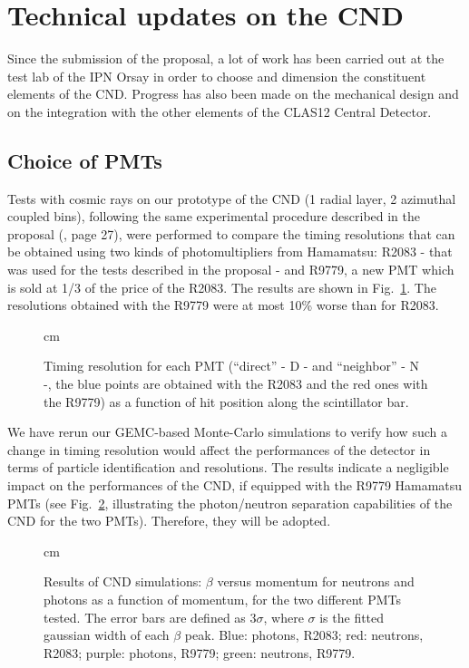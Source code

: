 \documentclass[12pt,oneside]{article}
\begin{document}
{\section{Technical updates on the CND}
Since the submission of the proposal, a lot of work has been carried out at the test lab of the IPN Orsay in order to choose and dimension the constituent elements of the CND. Progress has also been made on the mechanical design and on the integration with the other elements of the CLAS12 Central Detector. 

\subsection{Choice of PMTs}
Tests with cosmic rays on our prototype of the CND (1 radial layer, 2 azimuthal coupled bins), following the same experimental procedure described in the proposal (\cite{proposal}, page 27), were performed to compare the timing resolutions that can be obtained using two kinds of photomultipliers from Hamamatsu: R2083 - that was used for the tests described in the proposal - and R9779, a new PMT which is sold at 1/3 of the price of the R2083. The results are shown in Fig.~\ref{test_pmts}. The resolutions obtained with the R9779 were at most 10\% worse than for R2083. 

\begin{figure}[h]  
\begin{center}
 cm
\caption {Timing resolution for each PMT (``direct'' - D - and ``neighbor'' - N -, the blue points are obtained with the R2083 and the red ones with the R9779)  as a function of hit position along the scintillator bar.}
\label{test_pmts}
\end{center}
\end{figure}

We have rerun our GEMC-based Monte-Carlo simulations to verify how such a change in timing resolution would affect the performances of the detector in terms of particle identification and resolutions. The results indicate a negligible impact on the performances of the CND, if equipped with the R9779 Hamamatsu PMTs (see Fig.~\ref{pid_plot}, illustrating the photon/neutron separation capabilities of the CND for the two PMTs). Therefore, they will be adopted. 

\begin{figure}[h]  
\begin{center}
 cm
\caption {Results of CND simulations: $\beta$ versus momentum for neutrons and photons as a function of momentum, for the two different PMTs tested.  The error bars are defined as $3\sigma$, where $\sigma$ is the fitted gaussian width of each $\beta$ peak. Blue: photons, R2083; red: neutrons, R2083; purple: photons, R9779; green: neutrons, R9779.}
\label{pid_plot}
\end{center}
\end{figure}

}
\end{document}
